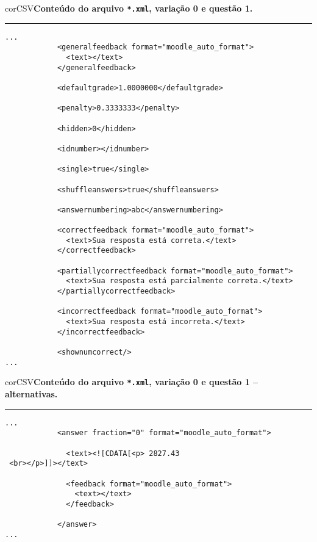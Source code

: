 \begin{myboxCode}{corCSV}{\textbf{Conteúdo do arquivo \texttt{*.xml}, variação 0 e questão 1.}}\vspace{3mm}
\hrule
{\scriptsize
\begin{verbatim}
...
            <generalfeedback format="moodle_auto_format">
              <text></text>
            </generalfeedback>
            
            <defaultgrade>1.0000000</defaultgrade>
            
            <penalty>0.3333333</penalty>

            <hidden>0</hidden>
            
            <idnumber></idnumber>
            
            <single>true</single>
            
            <shuffleanswers>true</shuffleanswers>
            
            <answernumbering>abc</answernumbering>
            
            <correctfeedback format="moodle_auto_format">
              <text>Sua resposta está correta.</text>
            </correctfeedback>
            
            <partiallycorrectfeedback format="moodle_auto_format">
              <text>Sua resposta está parcialmente correta.</text>
            </partiallycorrectfeedback>
            
            <incorrectfeedback format="moodle_auto_format">
              <text>Sua resposta está incorreta.</text>
            </incorrectfeedback>

            <shownumcorrect/>    
...
\end{verbatim}
}
\end{myboxCode}


\begin{myboxCode}{corCSV}{\textbf{Conteúdo do arquivo \texttt{*.xml}, variação 0 e questão 1 -- alternativas.}}\vspace{3mm}
\hrule
{\scriptsize
\begin{verbatim}
...
            <answer fraction="0" format="moodle_auto_format">
            
              <text><![CDATA[<p> 2827.43
 <br></p>]]></text>
            
              <feedback format="moodle_auto_format">
                <text></text>
              </feedback>
              
            </answer>
...
\end{verbatim}
}
\end{myboxCode}

